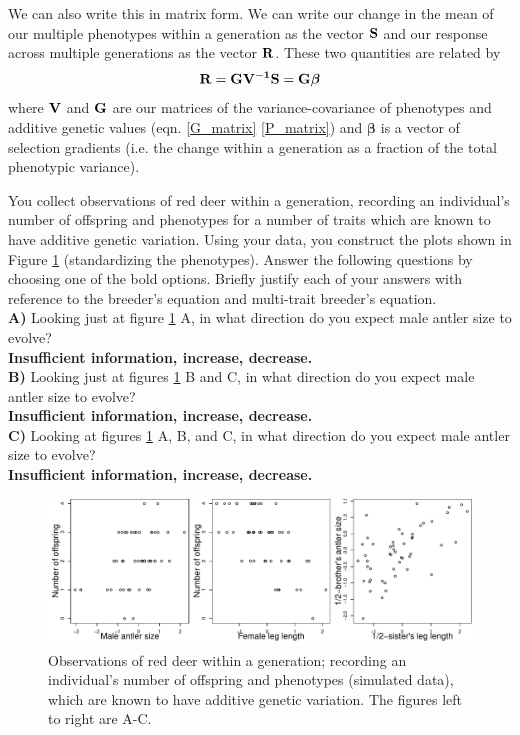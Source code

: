We can also write this in matrix form. We can write
our change in the mean of our multiple phenotypes within a generation as the vector $\bf{S}$ and our response across multiple generations as
the vector $\bf{R}$. These two quantities are related by 
\begin{equation}
\bf{R} = \bf{G} \bf{V}^{-1} \bf{S} = \bf{G} \boldsymbol{ \beta}
\end{equation}
 where $\bf{V}$ and $\bf{G}$ are our matrices of the
 variance-covariance of phenotypes and additive genetic values
 (eqn. \eqref{G_matrix} \eqref{P_matrix}) and
 $\boldsymbol{\beta}$ is a vector of selection gradients (i.e. the change within a generation as a fraction of the total phenotypic variance). 

\begin{question}
You collect observations of red deer within a generation, recording an
individual's number of offspring and phenotypes for a number of traits which are known to
have additive genetic variation. Using your data, you construct the plots shown in
Figure \ref{fig:red_deer_Q} (standardizing the phenotypes). Answer the following
questions by choosing one of the bold options. Briefly justify each of your answers with reference to the breeder's
equation and multi-trait breeder's equation. \\
{\bf A)}	Looking just at figure \ref{fig:red_deer_Q} A, in what direction do you expect male antler size to evolve? \\
{\bf Insufficient information, increase, decrease.}\\

{\bf B)}	Looking just at figures \ref{fig:red_deer_Q} B and C, in what direction do you expect male antler size to evolve? \\
{\bf Insufficient information, increase, decrease.}\\

{\bf C)}	Looking at figures \ref{fig:red_deer_Q} A, B, and C, in what direction do you expect male antler size to evolve? \\
{\bf Insufficient information, increase, decrease.}\\
\end{question}

\begin{figure}
\begin{center}
\includegraphics[width=\textwidth]{figures/Red_deer_selection.pdf}
\end{center}
\caption{ Observations of red deer within a generation; recording an
individual's number of offspring and phenotypes (simulated data), which are known to
have additive genetic variation. The figures left to right are A-C.  } \label{fig:red_deer_Q}
\end{figure}


